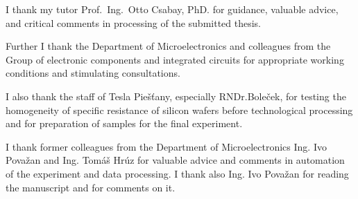 \par
I thank my tutor Prof.\ Ing.\ Otto Csabay, PhD. for guidance, valuable
advice, and critical comments in processing of the submitted thesis.

\par
Further I thank the Department of Microelectronics and colleagues from
the Group of electronic components and integrated circuits for
appropriate working conditions and stimulating consultations.

\par
I also thank the staff of Tesla Piešťany, especially RNDr.Boleček, for
testing the homogeneity of specific resistance of silicon wafers
before technological processing and for preparation of samples for the
final experiment.

\par
I thank former colleagues from the Department of Microelectronics
Ing. Ivo Považan and Ing. Tomáš Hrúz for valuable advice and comments
in automation of the experiment and data processing. I thank also
Ing. Ivo Považan for reading the manuscript and for comments on it.
